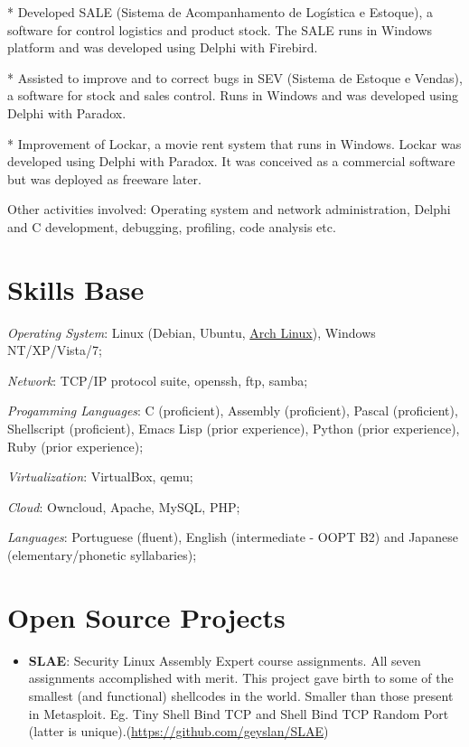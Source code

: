 \documentclass[margin]{res}
\begin{document}
\begin{resume}
* Developed SALE (Sistema de Acompanhamento de Logística e Estoque), a
software for control logistics and product stock. The SALE runs in
Windows platform and was developed using Delphi with Firebird.

* Assisted to improve and to correct bugs in SEV (Sistema de Estoque e
Vendas), a software for stock and sales control. Runs in Windows and
was developed using Delphi with Paradox.

* Improvement of Lockar, a movie rent system that runs in Windows.
Lockar was developed using Delphi with Paradox. It was conceived as a
commercial software but was deployed as freeware later.

Other activities involved: Operating system and network
administration, Delphi and C development, debugging, profiling, code
analysis etc.

\section{Skills Base}
\textit{Operating System}: Linux (Debian, Ubuntu, \underline{Arch
  Linux}), Windows NT/XP/Vista/7;

\textit{Network}: TCP/IP protocol suite, openssh, ftp, samba;

\textit{Progamming Languages}: C (proficient), Assembly (proficient),
Pascal (proficient), Shellscript (proficient), Emacs Lisp (prior
experience), Python (prior experience), Ruby (prior experience);

\textit{Virtualization}: VirtualBox, qemu;

\textit{Cloud}: Owncloud, Apache, MySQL, PHP;

\textit{Languages}: Portuguese (fluent), English (intermediate - OOPT
B2) and Japanese (elementary/phonetic syllabaries);

\section{Open Source Projects}
\begin{itemize}
\item \textbf{SLAE}: Security Linux Assembly Expert course
  assignments. All seven assignments accomplished with merit. This
  project gave birth to some of the smallest (and functional)
  shellcodes in the world. Smaller than those present in Metasploit.
  Eg. Tiny Shell Bind TCP and Shell Bind TCP Random Port (latter is
  unique).\newline (\url{https://github.com/geyslan/SLAE})\vspace{1mm}


\end{itemize}
\end{resume}
\end{document}
